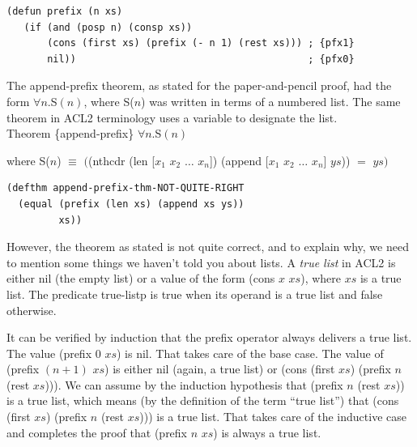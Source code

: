 \begin{code}
\begin{verbatim}
(defun prefix (n xs)
   (if (and (posp n) (consp xs))
       (cons (first xs) (prefix (- n 1) (rest xs))) ; {pfx1}
       nil))                                        ; {pfx0}
\end{verbatim}
\end{code}

The append-prefix theorem, as stated for the paper-and-pencil proof,
had the form $\forall n.$S$(n)$,
where S($n$)
was written in terms of a numbered list.
The same theorem in ACL2 terminology uses a variable to designate the list.
~\\

Theorem \{append-prefix\} $\forall n.$S$(n)$

where S($n$) $\equiv$ $($\textsf{(nthcdr (len [$x_1$ $x_2$ $\dots$ $x_n$]) (append [$x_1$ $x_2$ $\dots$ $x_n$] $ys$))} $=$ $ys)$

\begin{code}
\begin{verbatim}
(defthm append-prefix-thm-NOT-QUITE-RIGHT
  (equal (prefix (len xs) (append xs ys))
         xs))
\end{verbatim}
\end{code}

However, the theorem as stated
is not quite correct,
and to explain why, we need to mention
some things we haven't told you about lists. A
\label{true-list-def}\emph{true list}
in ACL2 is either \textsf{nil} (the empty list)
or a value of the form \textsf{(cons $x$ $xs$)},
where $xs$ is a true list.
The predicate
\textsf{true-listp}
is true when its operand
is a true list and false otherwise.

It can be verified by induction that
the \textsf{prefix} operator always delivers a true list.
The value \textsf{(prefix 0 $xs$)} is \textsf{nil}.
That takes care of the base case.
The value of \textsf{(prefix $(n+1)$ $xs$)} is either \textsf{nil}
(again, a true list)
or \textsf{(cons (first $xs$) (prefix $n$ (rest $xs$)))}.
We can assume by the induction hypothesis that
\textsf{(prefix $n$ (rest $xs$))} is a true list,
which means (by the definition of the term ``true list'')
that \textsf{(cons (first $xs$) (prefix $n$ (rest $xs$)))} is a true list.
That takes care of the inductive case and completes the proof
that \textsf{(prefix $n$ $xs$)} is always a true list.


